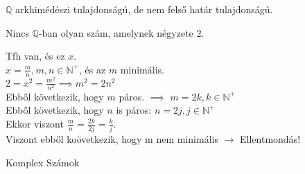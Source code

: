 \documentclass{beamer}
\begin{document}
\begin{frame}
\begin{tcolorbox}[title={Tétel: Q nem felső határ tulajdonságú}]
$\mathbb{Q}$ arkhimédészi tulajdonságú, de nem felső határ tulajdonságú.
\end{tcolorbox}
\end{frame}


\begin{frame}
\begin{tcolorbox}[title={Tétel: $\sqrt{2}$ nem racionális}]
Nincs $\mathbb{Q}$-ban olyan szám, amelynek négyzete 2.
\end{tcolorbox}

\begin{tcolorbox}[title={Bizonyítás (Indirekt)}]
Tfh van, és ez $x$.\\
$x = \frac{m}{n}, m,n \in \mathbb{N}^+$, és az $m$ minimális.\\
$2 = x^2 = \frac{m^2}{n^2} \implies m^2 = 2n^2$\\
Ebből következik, hogy $m$ páros. $\implies$ $m = 2k, k \in \mathbb{N}^+$\\
Ebből következik, hogy $n$ is páros: $n = 2j, j \in \mathbb{N}^+$\\
Ekkor viszont $\frac{m}{n} = \frac{2k}{2j} = \frac{k}{j}$.\\
Viszont ebből koövetkezik, hogy m nem minimális $\rightarrow$ Ellentmondás!
\end{tcolorbox}
\end{frame}

\begin{frame}
\begin{tcolorbox}[title={Def.: Valós számok halmaza}]
\end{tcolorbox}

\begin{tcolorbox}[title={Def.: néhány Függvény (?)}]
\end{tcolorbox}
\end{frame}

\begin{frame}
\begin{tcolorbox}[title={Def.: Bővített valós számok}]
\end{tcolorbox}
\end{frame}

\begin{frame}
\begin{tcolorbox}
{\Huge Komplex Számok}
\end{tcolorbox}
\end{frame}
\end{document}
